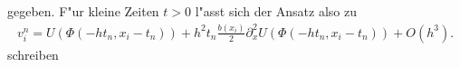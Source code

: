 gegeben. F"ur kleine Zeiten $t > 0$ l"asst sich der Ansatz also zu
\begin{align}
v^n_i = U(\Phi(-h t_n, x_i- t_n)) + h^2 t_n \frac{b(x_i)}{2} \partial^2_x U(\Phi(-h t_n, x_i - t_n)) + O(h^3).
\end{align}
schreiben

